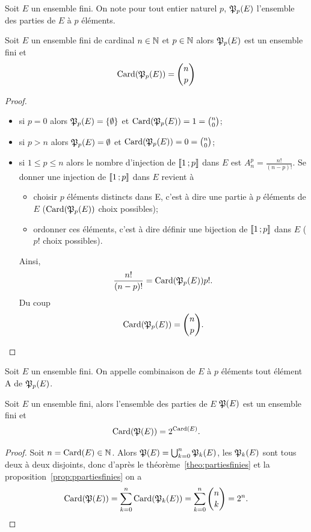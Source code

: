 Soit \(E\) un ensemble fini. On note pour tout entier naturel \(p\), \(\mathfrak{P}_p(E)\) l'ensemble des parties de \(E\) à \(p\) éléments.
\begin{prop}\label{prop:ppartiesfinies}
  Soit \(E\) un ensemble fini de cardinal \(n\in \mathbb{N}\) et \(p \in \mathbb{N}\) alors \(\mathfrak{P}_p(E)\) est un ensemble fini et
  \begin{equation}
    \operatorname{Card}(\mathfrak{P}_p(E))=\binom{n}{p}
  \end{equation}
\end{prop}
\begin{proof}
  \begin{itemize}
  \item si \(p=0\) alors \(\mathfrak{P}_p(E)=\{\emptyset\}\) et \(\operatorname{Card}(\mathfrak{P}_p(E))=1=\binom{n}{0}\);
  \item si \(p>n\) alors \(\mathfrak{P}_p(E)=\emptyset\) et \(\operatorname{Card}(\mathfrak{P}_p(E))=0=\binom{n}{0}\);
  \item si \(1\leqslant p \leqslant n\) alors le nombre d'injection de \(\mathopen{\llbracket}1\mathclose{}\mathpunct{};p\mathclose{\rrbracket}\) dans \(E\) est \(A_{n}^p=\frac{n!}{(n-p)!}\). Se donner une injection de  \(\mathopen{\llbracket}1\mathclose{}\mathpunct{};p\mathclose{\rrbracket}\) dans \(E\) revient à
    \begin{itemize}
    \item choisir \(p\) éléments distincts dans E, c'est à dire une partie à \(p\) éléments de \(E\) (\(\operatorname{Card}(\mathfrak{P}_p(E))\) choix possibles);
    \item ordonner ces éléments, c'est à dire définir une bijection de \(\mathopen{\llbracket}1\mathclose{}\mathpunct{};p\mathclose{\rrbracket}\) dans \(E\) (\(p!\) choix possibles).
    \end{itemize}
    Ainsi,
    \begin{equation}
      \frac{n!}{(n-p)!}=\operatorname{Card}(\mathfrak{P}_p(E)) p!.
    \end{equation}
    Du coup
    \begin{equation}
      \operatorname{Card}(\mathfrak{P}_p(E))=\binom{n}{p}.
    \end{equation}
  \end{itemize}
\end{proof}
\begin{defdef}
  Soit \(E\) un ensemble fini. On appelle combinaison de \(E\) à \(p\) éléments tout élément A de \(\mathfrak{P}_p(E)\).
\end{defdef}
\begin{prop}
  Soit \(E\) un ensemble fini, alors l'ensemble des parties de \(E\) \(\mathfrak{P}(E)\) est un ensemble fini et
  \begin{equation}
    \operatorname{Card}(\mathfrak{P}(E))=2^{\operatorname{Card}(E)}.
  \end{equation}
\end{prop}
\begin{proof}
  Soit \(n=\operatorname{Card}(E)\in \mathbb{N}\). Alors \(\mathfrak{P}(E)=\bigcup_{k=0}^{n}\mathfrak{P}_k(E)\), les \(\mathfrak{P}_k(E)\) sont tous deux à deux disjoints, donc d'après le théorème~\ref{theo:partiesfinies} et la proposition~\ref{prop:ppartiesfinies} on a
  \begin{equation}
    \operatorname{Card}(\mathfrak{P}(E))=\sum_{k=0}^n \operatorname{Card}(\mathfrak{P}_k(E))=\sum_{k=0}^n \binom{n}{k}=2^n.
  \end{equation}
\end{proof}
